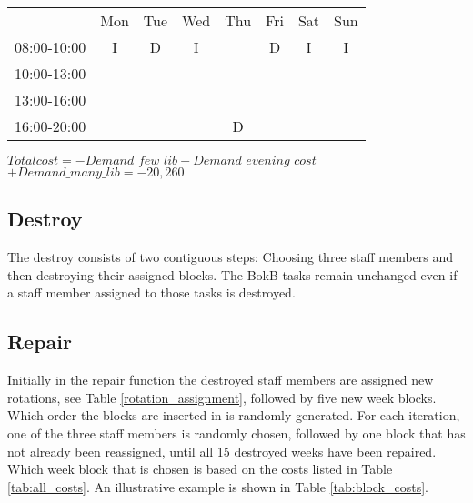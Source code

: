 \begin{table}[!h]
\begin{tabular}{cccccccc}
                                 & Mon                                             & Tue                    & Wed                                            & Thu                    & Fri                                            & Sat                    & Sun                    \\ \cline{2-8} 
\multicolumn{1}{c|}{08:00-10:00} & \multicolumn{1}{c|}{I} & \multicolumn{1}{c|}{\cellcolor[HTML]{FCFF2F}D} & \multicolumn{1}{c|}{I} & \multicolumn{1}{c|}{} & \multicolumn{1}{c|}{\cellcolor[HTML]{FCFF2F}D} & \multicolumn{1}{c|}{I} & \multicolumn{1}{c|}{I} \\ \cline{2-8} 
\multicolumn{1}{c|}{10:00-13:00} & \multicolumn{1}{c|}{}   & \multicolumn{1}{c|}{}  & \multicolumn{1}{c|}{} & \multicolumn{1}{c|}{}  & \multicolumn{1}{c|}{} &     &   \\ \cline{2-6}
\multicolumn{1}{c|}{13:00-16:00} & \multicolumn{1}{c|}{}   & \multicolumn{1}{c|}{}  & \multicolumn{1}{c|}{} & \multicolumn{1}{c|}{}  & \multicolumn{1}{c|}{}         &            &          \\ \cline{2-6}
\multicolumn{1}{c|}{16:00-20:00} & \multicolumn{1}{c|}{}  & \multicolumn{1}{c|}{}  & \multicolumn{1}{c|}{} & \multicolumn{1}{c|}{\cellcolor[HTML]{FCFF2F}D}  & \multicolumn{1}{c|}{} &         &         \\ \cline{2-6}
\end{tabular} 
\newline
$Total cost = -Demand\_few\_lib - Demand\_evening\_cost$
$+ Demand\_many\_lib = -20,260$

\end{table}



\subsection{Destroy}
The destroy consists of two contiguous steps: Choosing three staff members and then destroying their assigned blocks. The BokB tasks remain unchanged even if a staff member assigned to those tasks is destroyed. 
\subsection{Repair}
Initially in the repair function the destroyed staff members are assigned new rotations, see Table \ref{rotation_assignment}, followed by five new week blocks. Which order the blocks are inserted in is randomly generated. For each iteration, one of the three staff members is randomly chosen, followed by one block that has not already been reassigned, until all 15 destroyed weeks have been repaired. Which week block that is chosen is based on the costs listed in Table \ref{tab:all_costs}. An illustrative example is shown in Table \ref{tab:block_costs}.
